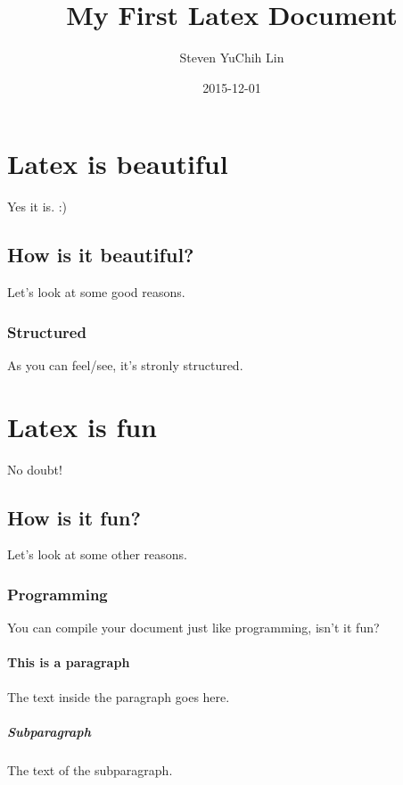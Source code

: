\documentclass{article}
\title{My First Latex Document}
\date{2015-12-01}
\author{Steven YuChih Lin}
\begin{document}
  \maketitle
  \newpage

  \section{Latex is beautiful}

  Yes it is. :)

  \subsection{How is it beautiful?}

  Let's look at some good reasons.

  \subsubsection{Structured}
  
  As you can feel/see, it's stronly structured.

  \section{Latex is fun}

  No doubt!

  \subsection{How is it fun?}

  Let's look at some other reasons.

  \subsubsection{Programming}

  You can compile your document just like programming, isn't it fun?

  \paragraph{This is a paragraph}

  The text inside the paragraph goes here.

  \subparagraph{Subparagraph}

  The text of the subparagraph.
\end{document}
